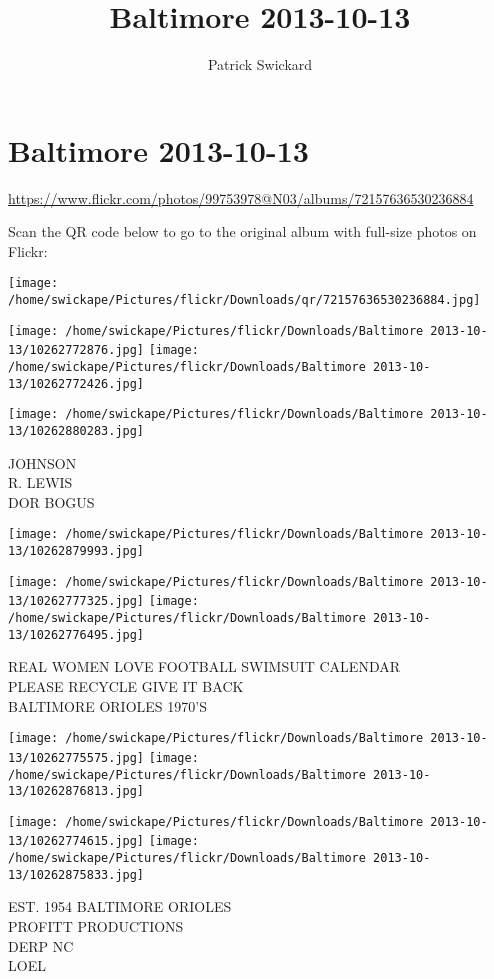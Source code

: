 \documentclass[10pt,letterpaper]{article}
\title{Baltimore 2013-10-13}
\author{Patrick Swickard}
\date{}
\begin{document}
\section*{Baltimore 2013-10-13}

\url{https://www.flickr.com/photos/99753978@N03/albums/72157636530236884}

Scan the QR code below to go to the original album with full-size photos on Flickr:

\texttt{[image: /home/swickape/Pictures/flickr/Downloads/qr/72157636530236884.jpg]}
\pagebreak

\texttt{[image: /home/swickape/Pictures/flickr/Downloads/Baltimore 2013-10-13/10262772876.jpg]}
\texttt{[image: /home/swickape/Pictures/flickr/Downloads/Baltimore 2013-10-13/10262772426.jpg]}

\vspace{0.25in}
\texttt{[image: /home/swickape/Pictures/flickr/Downloads/Baltimore 2013-10-13/10262880283.jpg]}

JOHNSON\\
R. LEWIS\\
DOR BOGUS
\pagebreak

\texttt{[image: /home/swickape/Pictures/flickr/Downloads/Baltimore 2013-10-13/10262879993.jpg]}

\vspace{0.25in}
\texttt{[image: /home/swickape/Pictures/flickr/Downloads/Baltimore 2013-10-13/10262777325.jpg]}
\texttt{[image: /home/swickape/Pictures/flickr/Downloads/Baltimore 2013-10-13/10262776495.jpg]}

REAL WOMEN LOVE FOOTBALL SWIMSUIT CALENDAR\\
PLEASE RECYCLE GIVE IT BACK\\
BALTIMORE ORIOLES 1970'S
\pagebreak

\texttt{[image: /home/swickape/Pictures/flickr/Downloads/Baltimore 2013-10-13/10262775575.jpg]}
\texttt{[image: /home/swickape/Pictures/flickr/Downloads/Baltimore 2013-10-13/10262876813.jpg]}

\texttt{[image: /home/swickape/Pictures/flickr/Downloads/Baltimore 2013-10-13/10262774615.jpg]}
\texttt{[image: /home/swickape/Pictures/flickr/Downloads/Baltimore 2013-10-13/10262875833.jpg]}

EST. 1954 BALTIMORE ORIOLES\\
PROFITT PRODUCTIONS\\
DERP NC\\
LOEL
\pagebreak
\end{document}
